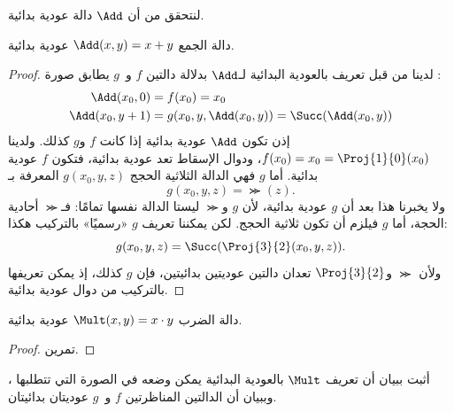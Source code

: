 \documentclass[../../../include/open-logic-section]{subfiles}
\begin{document}
لنتحقق من أن $\Add$ دالة عودية بدائية.

\begin{prop}
  دالة الجمع $\Add(x,y)=x+y$ عودية بدائية.
\end{prop}

\begin{proof}
لدينا من قبل تعريف بالعودية البدائية لـ$\Add$ بدلالة دالتين $f$ و~$g$
يطابق صورة :
\begin{align*}
  \Add(x_0, 0) & = f(x_0) = x_0\\
  \Add(x_0, y+1) & = g(x_0, y, \Add(x_0, y)) =
  \Succ(\Add(x_0, y))
\end{align*}
إذن تكون $\Add$ عودية بدائية إذا كانت $f$ و$g$ كذلك. ولدينا
$f(x_0)=x_0=\Proj{1}{0}(x_0)$، ودوال الإسقاط تعد عودية بدائية، فتكون
$f$ عودية بدائية. أما $g$ فهي الدالة الثلاثية الحجج $g(x_0,y,z)$
المعرفة بـ
\[
g(x_0, y, z) = \Succ(z).
\]
ولا يخبرنا هذا بعد أن $g$ عودية بدائية، لأن $g$ و$\Succ$ ليستا الدالة
نفسها تمامًا: فـ$\Succ$ أحادية الحجة، أما $g$ فيلزم أن تكون ثلاثية
الحجج. لكن يمكننا تعريف $g$ «رسميًا» بالتركيب هكذا:
\[
g(x_0, y, z) = \Succ(\Proj{3}{2}(x_0, y, z)).
\]
ولأن $\Succ$ و$\Proj{3}{2}$ تعدان دالتين عوديتين بدائيتين، فإن $g$
كذلك، إذ يمكن تعريفها بالتركيب من دوال عودية بدائية.
\end{proof}

\begin{prop}
  دالة الضرب $\Mult(x,y)=x\cdot y$ عودية بدائية.
\end{prop}

\begin{proof}
  تمرين.
\end{proof}

\begin{prob}
  أثبت  ببيان أن تعريف $\Mult$
  بالعودية البدائية يمكن وضعه في الصورة التي تتطلبها
  ، وببيان أن الدالتين
  المناظرتين $f$ و~$g$ عوديتان بدائيتان.
\end{prob}
\end{document}
